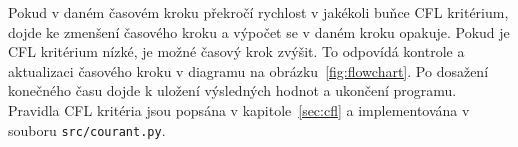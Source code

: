 Pokud v daném časovém kroku překročí rychlost v jakékoli buňce \acs{CFL} kritérium, dojde ke zmenšení časového kroku a výpočet se v daném kroku opakuje. Pokud je \acs{CFL} kritérium nízké, je možné časový krok zvýšit. To odpovídá kontrole a aktualizaci časového kroku v diagramu na obrázku~\ref{fig:flowchart}. Po dosažení konečného času dojde k uložení výsledných hodnot a ukončení programu. Pravidla \acs{CFL} kritéria jsou popsána v kapitole~\ref{sec:cfl} a implementována v souboru {\tt src/courant.py}.





% 
% 





% 

